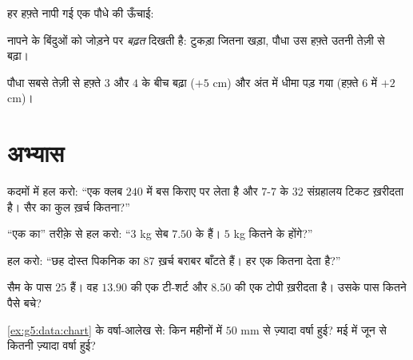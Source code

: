 \begin{example}[बदलती हुई राशि]\label{ex:g5:data:line}
हर हफ़्ते नापी गई एक पौधे की ऊँचाई:

\begin{omfigure}

{\small नापने के बिंदुओं को जोड़ने पर \emph{बढ़त} दिखती है:
टुकड़ा जितना खड़ा, पौधा उस हफ़्ते उतनी तेज़ी से बढ़ा।}
\end{omfigure}

पौधा सबसे तेज़ी से हफ़्ते $3$ और $4$ के बीच बढ़ा ($+5$ cm) और
अंत में धीमा पड़ गया (हफ़्ते $6$ में $+2$ cm)।
\end{example}

\section{अभ्यास}

\begin{exercise}[$\star$]\label{exo:g5:data:1}
कदमों में हल करो: ``एक क्लब $240$ में बस किराए पर लेता है और
$7$-$7$ के $32$ संग्रहालय टिकट ख़रीदता है। सैर का कुल ख़र्च कितना?''
\end{exercise}

\begin{exercise}[$\star$]\label{exo:g5:data:2}
``एक का'' तरीक़े से हल करो: ``$3$ kg सेब $7.50$ के हैं। $5$ kg
कितने के होंगे?''
\end{exercise}

\begin{exercise}[$\star$]\label{exo:g5:data:3}
हल करो: ``छह दोस्त पिकनिक का $87$ ख़र्च बराबर बाँटते हैं। हर एक
कितना देता है?''
\end{exercise}

\begin{exercise}[$\star$]\label{exo:g5:data:4}
सैम के पास $25$ हैं। वह $13.90$ की एक टी-शर्ट और $8.50$ की एक
टोपी ख़रीदता है। उसके पास कितने पैसे बचे?
\end{exercise}

\begin{exercise}[$\star$]\label{exo:g5:data:5}
\cref{ex:g5:data:chart} के वर्षा-आलेख से: किन महीनों में $50$ mm
से ज़्यादा वर्षा हुई? मई में जून से कितनी ज़्यादा वर्षा
हुई?
\end{exercise}

